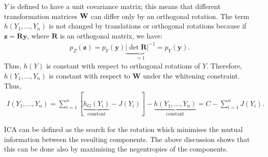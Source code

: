\begin{enumerate}
\begin{solution}
    $Y$ is defined to have a unit covariance matrix; this means that
    different transformation matrices ${\bf W}$ can differ only by an
    orthogonal rotation.
    The term $h(Y_1, \ldots, Y_n)$ is not changed by translations or
    orthogonal rotations because if $\mathbf{z}=\mathbf{Ry}$, where
    $\mathbf{R}$ is an orthogonal matrix, we have:
    \begin{align*}
      p_Z(\mathbf{z}) = p_Y(\mathbf{y})
      \underbrace{|\det{\mathbf{R}}|^{-1}}_{=1} = p_Y(\mathbf{y}).
    \end{align*}
    Thus, $h(Y)$ is constant with respect to orthogonal rotations of
    $Y$.  Therefore, $h(Y_1, \ldots, Y_n)$ is constant with respect to
    $\mathbf{W}$ under the whitening constraint.  Thus,
    \begin{align*}
      I(Y_1, \ldots, Y_n) = \sum_{i=1}^n
      [\underbrace{h_G(Y_i)}_{\text{constant}} - J(Y_i)] -
      \underbrace{h(Y_1, \ldots, Y_n)}_{\text{constant}} = C -
      \sum_{i=1}^n J(Y_i).
    \end{align*}

    ICA can be defined as the search for the rotation which minimises
    the mutual information between the resulting components.  The above
    discussion shows that this can be done also by
    maximising the negentropies of the components.

  \end{solution}
  

\end{enumerate}
